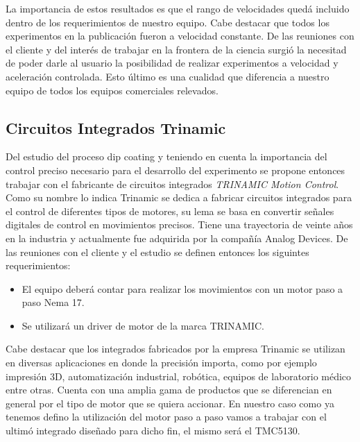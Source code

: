 La importancia de estos resultados es que el rango de velocidades quedá incluido dentro de los requerimientos de nuestro equipo. Cabe destacar que todos los experimentos en la publicación fueron a  velocidad constante. De las reuniones con el cliente y del interés de trabajar en la frontera de la ciencia surgió la necesitad de poder darle al usuario la posibilidad de realizar experimentos a velocidad y aceleración controlada.  Esto último es una cualidad que diferencia a nuestro equipo de todos los equipos comerciales relevados. 
  

\subsection{Circuitos Integrados Trinamic}

Del estudio del proceso dip coating y teniendo en cuenta la importancia del control preciso necesario para el desarrollo del experimento se propone entonces trabajar con el fabricante de circuitos integrados \textit{TRINAMIC Motion Control}\citep{3_web_trinamic}. Como su nombre lo indica Trinamic se dedica a fabricar circuitos integrados para el control de diferentes tipos de motores, su lema se basa en convertir señales digitales de control en movimientos precisos. Tiene una trayectoria de veinte años en la industria y actualmente fue adquirida por la compañía Analog Devices.
De las reuniones con el cliente y el estudio se definen entonces los siguintes requerimientos:
			
\begin{itemize}
\item El equipo deberá contar para realizar los movimientos con un motor paso a paso Nema 17.
\item Se utilizará un driver de motor de la marca TRINAMIC.
\end{itemize}

Cabe destacar que los integrados fabricados por la empresa Trinamic se utilizan en diversas aplicaciones en donde la precisión importa, como por ejemplo impresión 3D, automatización industrial, robótica, equipos de laboratorio médico entre otras.
Cuenta con una amplia gama de productos que se diferencian en general por el tipo de motor que se quiera accionar. En nuestro caso como ya tenemos defino la utilización del motor paso a paso vamos a trabajar con el ultimó integrado diseñado para dicho fin, el mismo será el TMC5130. 
  
